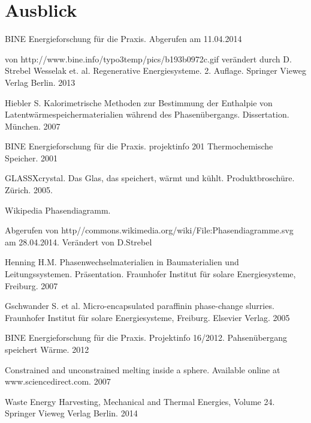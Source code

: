 \documentclass[11pt,a4paper]{scrartcl}
\begin{document}
\section{Ausblick}
\newpage
\listoftables
\newpage
\listoffigures
\newpage
\begin{thebibliography}{99}
	BINE Energieforschung für die Praxis. Abgerufen am 11.04.2014
	
	von http://www.bine.info/typo3temp/pics/b193b0972c.gif verändert durch D. Strebel
	Wesselak et. al. Regenerative Energiesysteme. 2. Auflage.
	Springer Vieweg Verlag Berlin. 2013
	
	 Hiebler S. Kalorimetrische Methoden zur Bestimmung der
	Enthalpie von Latentwärmespeichermaterialien während des Phasenübergangs. Dissertation.
	München. 2007
	
	 BINE Energieforschung für die Praxis. projektinfo 2\/01
	Thermochemische Speicher. 2001
	
	 GLASSX\circledR crystal. Das Glas, das speichert, wärmt und
	kühlt. Produktbroschüre. Zürich. 2005.
	 
	 Wikipedia Phasendiagramm. 
	
	Abgerufen von
	http//commons.wikimedia.org/wiki/File:Phasendiagramme.svg am 28.04.2014.
	Verändert von D.Strebel
	
	 Henning H.M. Phasenwechselmaterialien in Baumaterialien und
	Leitungssystemen. Präsentation. Fraunhofer Institut für solare Energiesysteme,
	Freiburg. 2007
	
	 Gschwander S. et al. Micro-encapsulated paraffinin
	phase-change slurries. Fraunhofer Institut für solare Energiesysteme,
	Freiburg. Elsevier Verlag. 2005

	 BINE Energieforschung für die Praxis. Projektinfo 16/2012.
	Pahsenübergang speichert Wärme. 2012
		
	 Constrained and unconstrained melting inside a sphere. Available online at www.sciencedirect.com. 2007
	
	 Waste Energy Harvesting, Mechanical and Thermal Energies, Volume 24.
		Springer Vieweg Verlag Berlin. 2014
\end{thebibliography}
\end{document}
